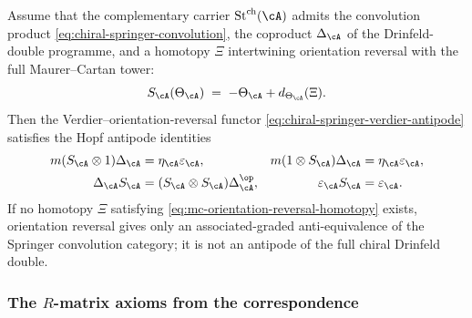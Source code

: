 \begin{conjecture}
\label{conj:chiral-springer-antipode-identities}
Assume that the complementary carrier
\(\Stch(\cA)\) admits the convolution product
\eqref{eq:chiral-springer-convolution}, the coproduct
\(\Delta_{\cA}\) of the Drinfeld-double programme, and a homotopy
\(\Xi\) intertwining orientation reversal with the full
Maurer--Cartan tower:
\begin{equation}
\label{eq:mc-orientation-reversal-homotopy}
S_{\cA}(\Theta_{\cA})
\;=\;
-\Theta_{\cA}+d_{\Theta_{\cA}}(\Xi).
\end{equation}
Then the Verdier--orientation-reversal functor
\eqref{eq:chiral-springer-verdier-antipode} satisfies the Hopf
antipode identities
\begin{equation}
\label{eq:chiral-springer-antipode-identities}
\begin{aligned}
m(S_{\cA}\otimes 1)\Delta_{\cA}
&=\eta_{\cA}\varepsilon_{\cA},
&
m(1\otimes S_{\cA})\Delta_{\cA}
&=\eta_{\cA}\varepsilon_{\cA},\\
\Delta_{\cA}S_{\cA}
&=(S_{\cA}\otimes S_{\cA})\Delta_{\cA}^{\op},
&
\varepsilon_{\cA}S_{\cA}
&=\varepsilon_{\cA}.
\end{aligned}
\end{equation}
If no homotopy \(\Xi\) satisfying
\eqref{eq:mc-orientation-reversal-homotopy} exists, orientation
reversal gives only an associated-graded anti-equivalence of the
Springer convolution category; it is not an antipode of the full
chiral Drinfeld double.
\end{conjecture}

\subsubsection{The $R$-matrix axioms from the correspondence}

